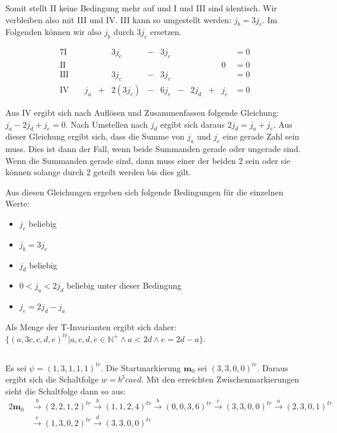\documentclass[10pt,a4paper,oneside,ngerman,numbers=noenddot]{scrartcl}
\begin{document}
Somit stellt II keine Bedingung mehr auf und I und III sind identisch. Wir verbleiben also mit III und IV. III kann so umgestellt werden: \(j_b = 3j_c\). Im Folgenden können wir also \(j_b\) durch \(3j_c\) ersetzen.

\begin{alignat*}{7}
	\text{I} && && 3j_c &-& 3j_c && && &= 0 \\
	\text{II} && && && && && 0 &= 0 \\
	\text{III} && && 3j_c &-& 3j_c && && &= 0 \\
	\text{IV} && \; j_a &+& 2(3j_c) &-& 6j_c &-& 2j_d &+& j_e &= 0
\end{alignat*}

Aus IV ergibt sich nach Auflösen und Zusammenfassen folgende Gleichung: \(j_a - 2j_d + j_e = 0\). Nach Umstellen nach \(j_d\) ergibt sich daraus \(2j_d = j_a + j_e\). Aus dieser Gleichung ergibt sich, dass die Summe von \(j_a\) und \(j_e\) eine gerade Zahl sein muss. Dies ist dann der Fall, wenn beide Summanden gerade oder ungerade sind. Wenn die Summanden gerade sind, dann muss einer der beiden 2 sein oder sie können solange durch 2 geteilt werden bis dies gilt.

Aus diesen Gleichungen ergeben sich folgende Bedingungen für die einzelnen Werte:
\begin{itemize}
	\item \(j_c\) beliebig
	\item \(j_b = 3j_c\)
	\item \(j_d\) beliebig
	\item \(0 < j_a < 2j_d\) beliebig unter dieser Bedingung
	\item \(j_e = 2j_d - j_a\)
\end{itemize}

Als Menge der T-Invarianten ergibt sich daher: \(\{(a,3c,c,d,e)^{tr} | a,c,d,e \in \mathbb{N}^+ \wedge a < 2d \wedge e = 2d -a\}\).

\subsection{}
Es sei \(\psi = (1, 3, 1, 1, 1)^{tr}\). Die Startmarkierung \(\textbf{m}_0\) sei \((3, 3, 0, 0)^{tr}\). Daraus ergibt sich die Schaltfolge \(w = b^3caed\). Mit den erreichten Zwischenmarkierungen sieht die Schaltfolge dann so aus:
\begin{alignat*}{2}
	\textbf{m}_0 &\overset{b}{\rightarrow} (2, 2, 1, 2)^{tr} \overset{b}{\rightarrow} (1, 1, 2, 4)^{tr} \overset{b}{\rightarrow} (0, 0, 3, 6)^{tr} \overset{c}{\rightarrow} (3, 3, 0, 0)^{tr} \overset{a}{\rightarrow} (2, 3, 0, 1)^{tr} \\
	&\overset{e}{\rightarrow} (1, 3, 0, 2)^{tr} \overset{d}{\rightarrow} (3, 3, 0, 0)^{tr}
\end{alignat*}
\end{document}
